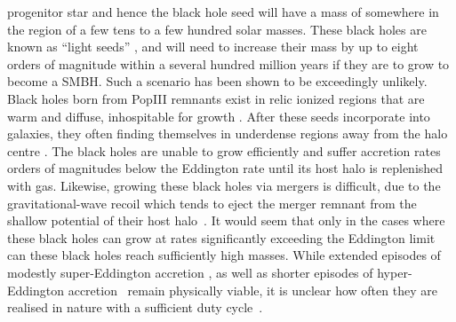 \documentclass[graphics, twocolumn, usenatbib]{mn2e}
\begin{document}
progenitor star and hence the black hole seed will have a mass of somewhere in the region of a
few tens to a few hundred solar masses. These black holes are known as ``light seeds'' \citep[e.g.][]{Volonteri_2010a}, and will need to increase their mass by up to
eight orders of magnitude within a several hundred million years if they are to grow to become a SMBH. Such
a scenario has been shown to be exceedingly unlikely. Black holes born from PopIII remnants exist
in relic ionized regions that are warm and diffuse, inhospitable for growth
\citep{Whalen_2004, Milosavljevic_2009, Alvarez_2009}.  After these seeds incorporate into galaxies,
they often finding themselves in underdense regions away from the halo centre \citep{Smith_2018}.
The black holes
are unable to grow efficiently and suffer accretion rates orders of magnitudes below the Eddington
rate until its host halo is replenished with gas. 
Likewise, growing these black holes via mergers is difficult, due to the gravitational-wave recoil
which tends to eject the merger remnant from the shallow potential of their host halo~\citep{Haiman_2004}.
It would seem that only in the cases where these 
black holes can grow at rates significantly
exceeding the Eddington limit can these black holes reach sufficiently high masses. While extended episodes of modestly 
super-Eddington accretion \citep{Madau_2001, Madau_2014, Alexander_2014,
  Lupi_2016}, as well as shorter episodes of hyper-Eddington accretion~\citep{Inayoshi_2018}
remain physically viable, it is unclear how often they are realised in nature with a
sufficient duty cycle~\citep{Pacucci_2017}.
\end{document}
